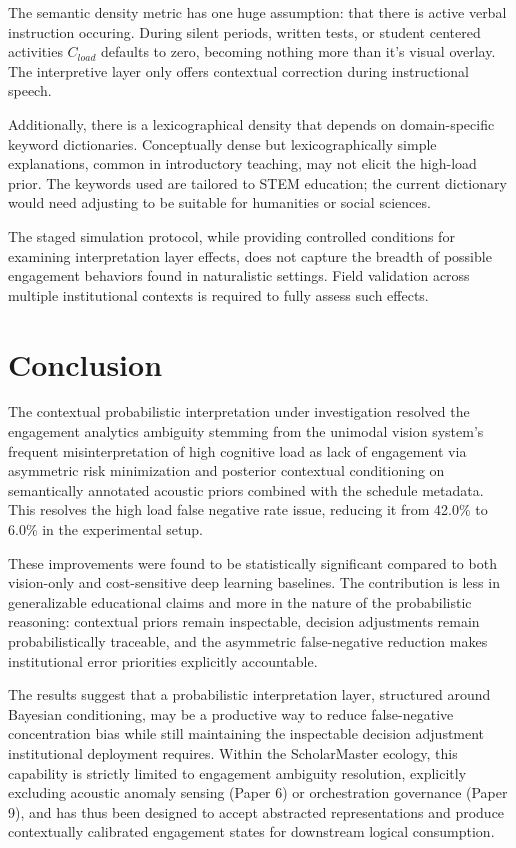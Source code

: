 \documentclass[conference]{IEEEtran}
\begin{document}
The semantic density metric has one huge assumption: that there is active verbal instruction occuring. During silent periods, written tests, or student centered activities $C_{load}$ defaults to zero, becoming nothing more than it’s visual overlay. The interpretive layer only offers contextual correction during instructional speech.

Additionally, there is a lexicographical density that depends on domain-specific keyword dictionaries. Conceptually dense but lexicographically simple explanations, common in introductory teaching, may not elicit the high-load prior. The keywords used are tailored to STEM education; the current dictionary would need adjusting to be suitable for humanities or social sciences.

The staged simulation protocol, while providing controlled conditions for examining interpretation layer effects, does not capture the breadth of possible engagement behaviors found in naturalistic settings. Field validation across multiple institutional contexts is required to fully assess such effects.

\section{Conclusion}
The contextual probabilistic interpretation under investigation resolved the engagement analytics ambiguity stemming from the unimodal vision system’s frequent misinterpretation of high cognitive load as lack of engagement via asymmetric risk minimization and posterior contextual conditioning on semantically annotated acoustic priors combined with the schedule metadata. This resolves the high load false negative rate issue, reducing it from 42.0\% to 6.0\% in the experimental setup.

These improvements were found to be statistically significant compared to both vision-only and cost-sensitive deep learning baselines. The contribution is less in generalizable educational claims and more in the nature of the probabilistic reasoning: contextual priors remain inspectable, decision adjustments remain probabilistically traceable, and the asymmetric false-negative reduction makes institutional error priorities explicitly accountable.

The results suggest that a probabilistic interpretation layer, structured around Bayesian conditioning, may be a productive way to reduce false-negative concentration bias while still maintaining the inspectable decision adjustment institutional deployment requires. Within the ScholarMaster ecology, this capability is strictly limited to engagement ambiguity resolution, explicitly excluding acoustic anomaly sensing (Paper 6) or orchestration governance (Paper 9), and has thus been designed to accept abstracted representations and produce contextually calibrated engagement states for downstream logical consumption.
\end{document}
